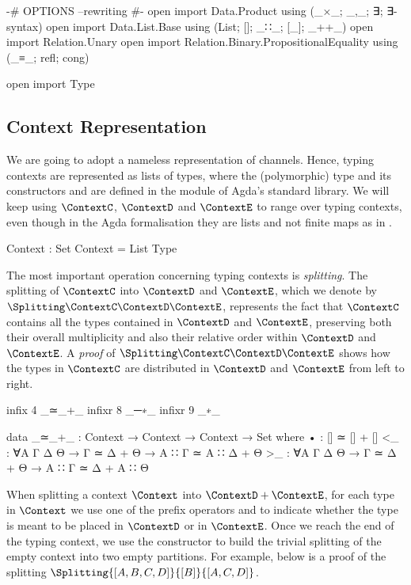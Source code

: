 \begin{code}[hide]
{-# OPTIONS --rewriting #-}
open import Data.Product using (_×_; _,_; ∃; ∃-syntax)
open import Data.List.Base using (List; []; _∷_; [_]; _++_)
open import Relation.Unary
open import Relation.Binary.PropositionalEquality using (_≡_; refl; cong)

open import Type
\end{code}

\subsection{Context Representation}
\label{sec:context-agda}

We are going to adopt a nameless representation of channels. Hence, typing
contexts are represented as lists of types, where the (polymorphic) type
 and its constructors \AgdaInductiveConstructor{[]} and
 are defined in the module
 of Agda's standard library. We will keep using
$\ContextC$, $\ContextD$ and $\ContextE$ to range over typing contexts, even
though in the Agda formalisation they are lists and not finite maps as in
.

\begin{code}
Context : Set
Context = List Type
\end{code}

The most important operation concerning typing contexts is \emph{splitting}. The
splitting of $\ContextC$ into $\ContextD$ and $\ContextE$, which we denote by
$\Splitting\ContextC\ContextD\ContextE$, represents the fact that $\ContextC$
contains all the types contained in $\ContextD$ and $\ContextE$, preserving both
their overall multiplicity and also their relative order within $\ContextD$ and
$\ContextE$. A \emph{proof} of $\Splitting\ContextC\ContextD\ContextE$ shows how
the types in $\ContextC$ are distributed in $\ContextD$ and $\ContextE$ from
left to right.

\begin{code}[hide]
infix  4 _≃_+_
infixr 8 _─∗_
infixr 9 _∗_
\end{code}
\begin{code}
data _≃_+_ : Context → Context → Context → Set where
  •   : [] ≃ [] + []
  <_  : ∀{A Γ Δ Θ} → Γ ≃ Δ + Θ → A ∷ Γ ≃ A ∷ Δ + Θ
  >_  : ∀{A Γ Δ Θ} → Γ ≃ Δ + Θ → A ∷ Γ ≃ Δ + A ∷ Θ
\end{code}

When splitting a context $\Context$ into $\ContextD + \ContextE$, for each type
in $\Context$ we use one of the prefix operators \AgdaInductiveConstructor{<}
and \AgdaInductiveConstructor{>} to indicate whether the type is meant to be
placed in $\ContextD$ or in $\ContextE$. Once we reach the end of the typing
context, we use the constructor  to build the
trivial splitting of the empty context into two empty partitions.
%
For example, below is a proof of the splitting $\Splitting{[A, B, C,
D]}{[B]}{[A, C, D]}$.

